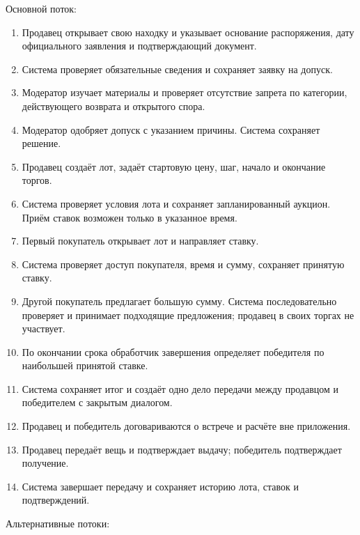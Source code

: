 Основной поток:

\begin{enumerate}
\item Продавец открывает свою находку и указывает основание распоряжения, дату официального заявления и подтверждающий документ.
\item Система проверяет обязательные сведения и сохраняет заявку на допуск.
\item Модератор изучает материалы и проверяет отсутствие запрета по категории, действующего возврата и открытого спора.
\item Модератор одобряет допуск с указанием причины. Система сохраняет решение.
\item Продавец создаёт лот, задаёт стартовую цену, шаг, начало и окончание торгов.
\item Система проверяет условия лота и сохраняет запланированный аукцион. Приём ставок возможен только в указанное время.
\item Первый покупатель открывает лот и направляет ставку.
\item Система проверяет доступ покупателя, время и сумму, сохраняет принятую ставку.
\item Другой покупатель предлагает большую сумму. Система последовательно проверяет и принимает подходящие предложения; продавец в своих торгах не участвует.
\item По окончании срока обработчик завершения определяет победителя по наибольшей принятой ставке.
\item Система сохраняет итог и создаёт одно дело передачи между продавцом и победителем с закрытым диалогом.
\item Продавец и победитель договариваются о встрече и расчёте вне приложения.
\item Продавец передаёт вещь и подтверждает выдачу; победитель подтверждает получение.
\item Система завершает передачу и сохраняет историю лота, ставок и подтверждений.
\end{enumerate}

Альтернативные потоки:

